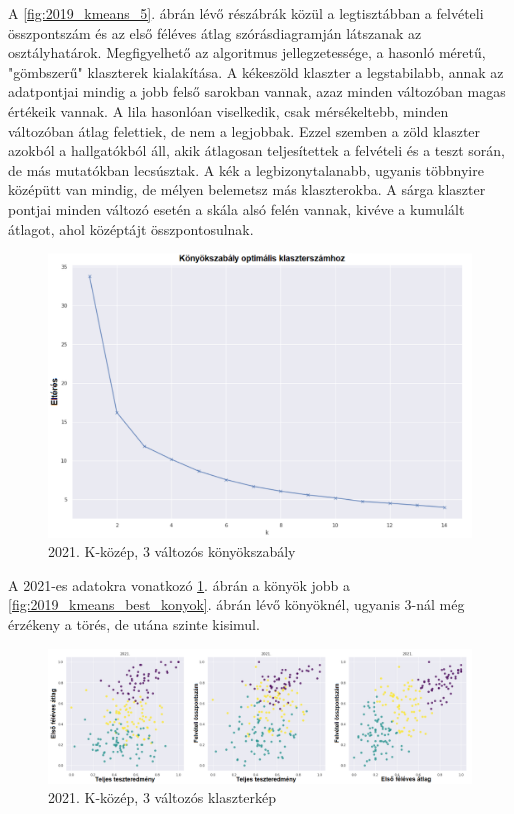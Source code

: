 \documentclass[12pt]{article}
\begin{document}
A \ref{fig:2019_kmeans_5}. ábrán lévő részábrák közül a legtisztábban a felvételi összpontszám és az első féléves átlag szórásdiagramján látszanak az osztályhatárok. Megfigyelhető az algoritmus jellegzetessége, a hasonló méretű, "gömbszerű" klaszterek kialakítása. A kékeszöld klaszter a legstabilabb, annak az adatpontjai mindig a jobb felső sarokban vannak, azaz minden változóban magas értékeik vannak. A lila hasonlóan viselkedik, csak mérsékeltebb, minden változóban átlag felettiek, de nem a legjobbak. Ezzel szemben a zöld klaszter azokból a hallgatókból áll, akik átlagosan teljesítettek a felvételi és a teszt során, de más mutatókban lecsúsztak. A kék a legbizonytalanabb, ugyanis többnyire középütt van mindig, de mélyen belemetsz más klaszterokba. A sárga klaszter pontjai minden változó esetén a skála alsó felén vannak, kivéve a kumulált átlagot, ahol középtájt összpontosulnak.

\begin{figure}[H]
\centering
\includegraphics[scale = 0.6]{kepek/2021_kmeans_konyok.png}
\caption{2021. K-közép, 3 változós könyökszabály}
\label{fig:2021_kmeans_konyok}
\end{figure}

A 2021-es adatokra vonatkozó \ref{fig:2021_kmeans_konyok}. ábrán a könyök jobb a \ref{fig:2019_kmeans_best_konyok}. ábrán lévő könyöknél, ugyanis 3-nál még érzékeny a törés, de utána szinte kisimul.

\begin{figure}[H]
\centering
\includegraphics[width = \textwidth]{kepek/2021klacter.png}
\caption{2021. K-közép, 3 változós klaszterkép}
\label{fig:2021klacter}
\end{figure}
\end{document}
